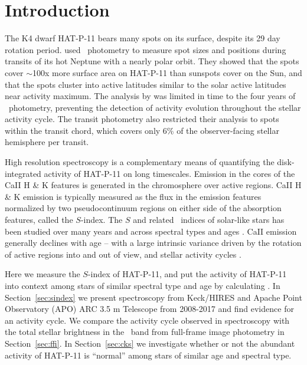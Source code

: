 
\section{Introduction}

The K4 dwarf HAT-P-11 bears many spots on its surface, despite its 29 day rotation period. \citet{Morris2017} used \kepler\ photometry to measure spot sizes and positions during transits of its hot Neptune with a nearly polar orbit. They showed that the spots cover $\sim$100x more surface area on HAT-P-11 than sunspots cover on the Sun, and that the spots cluster into active latitudes similar to the solar active latitudes near activity maximum. The analysis by \citet{Morris2017} was limited in time to the four years of \kepler\ photometry, preventing the detection of activity evolution throughout the stellar activity cycle. The transit photometry also restricted their analysis to spots within the transit chord, which covers only 6\% of the observer-facing stellar hemisphere per transit. 

High resolution spectroscopy is a complementary means of quantifying the disk-integrated activity of HAT-P-11 on long timescales. Emission in the cores of the CaII H \& K features is generated in the chromosphere over active regions. CaII H \& K emission is typically measured as the flux in the emission features normalized by two pseudocontinuum regions on either side of the absorption features, called the $S$-index. The $S$ and related \rprime\ indices of solar-like stars has been studied over many years and across spectral types and ages \citep{Wilson1978, Noyes1984, Duncan1991, Baliunas1995}. CaII emission generally declines with age \citep{Skumanich1972} -- with a large intrinsic variance driven by the rotation of active regions into and out of view, and stellar activity cycles \citep[see review by][]{Hall2008}.

Here we measure the $S$-index of HAT-P-11, and put the activity of HAT-P-11 into context among stars of similar spectral type and age by calculating \rprime. In Section~\ref{sec:sindex} we present spectroscopy from Keck/HIRES and Apache Point Observatory (APO) ARC 3.5 m Telescope from 2008-2017 and find evidence for an activity cycle. We compare the activity cycle observed in spectroscopy with the total stellar brightness in the \kepler\ band from full-frame image photometry in Section~\ref{sec:ffi}. In Section~\ref{sec:cks} we investigate whether or not the abundant activity of HAT-P-11 is ``normal'' among stars of similar age and spectral type.

